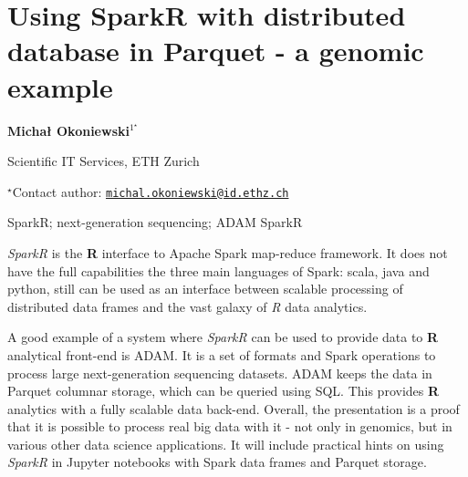 \documentclass[\main/boa.tex]{subfiles}
\begin{document}
\pagestyle{empty}

\section{Using SparkR with distributed database in Parquet - a genomic example}

\begin{center}
  {\bf Michał Okoniewski$^{1^\star}$}
\end{center}

\vskip 0.3cm

\begin{affiliations}
\begin{enumerate}
\begin{minipage}{0.915\textwidth}
\centering
\item Scientific IT Services, ETH Zurich \\[-2pt]
\end{minipage}
\end{enumerate}
$^\star$Contact author: \href{mailto:michal.okoniewski@id.ethz.ch}{\nolinkurl{michal.okoniewski@id.ethz.ch}}\\
\end{affiliations}

\vskip 0.5cm

\begin{minipage}{0.915\textwidth}
\keywords SparkR; next-generation sequencing; ADAM
\packages SparkR
\end{minipage}

\vskip 0.8cm

\emph{SparkR} is the \textbf{R} interface to Apache Spark map-reduce
framework. It does not have the full capabilities the three main
languages of Spark: scala, java and python, still can be used as an
interface between scalable processing of distributed data frames and the
vast galaxy of \emph{R} data analytics.

A good example of a system where \emph{SparkR} can be used to provide
data to \textbf{R} analytical front-end is ADAM. It is a set of formats
and Spark operations to process large next-generation sequencing
datasets. ADAM keeps the data in Parquet columnar storage, which can be
queried using SQL. This provides \textbf{R} analytics with a fully
scalable data back-end. Overall, the presentation is a proof that it is
possible to process real big data with it - not only in genomics, but in
various other data science applications. It will include practical hints
on using \emph{SparkR} in Jupyter notebooks with Spark data frames and
Parquet storage.
\end{document}
